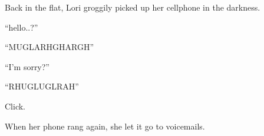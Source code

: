 Back in the flat, Lori groggily picked up her cellphone in the
darkness.



``hello..?''



``MUGLARHGHARGH''



``I'm sorry?''



``RHUGLUGLRAH''



Click.



When her phone rang again, she let it go to voicemails. 

 




